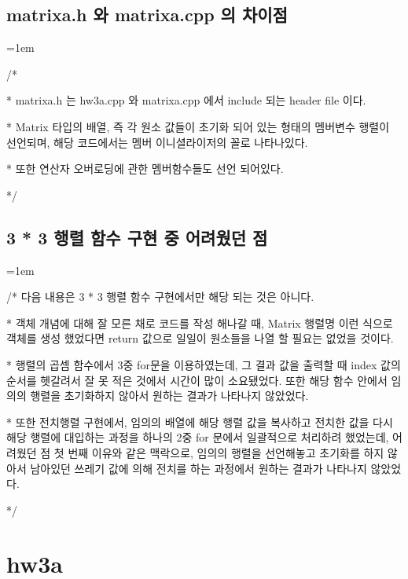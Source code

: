 \documentclass[twoside,twocolumn]{article}
\newenvironment{itemizeReduced}{
\begin{list}{\labelitemi}{\leftmargin=1em}
\setlength{\itemsep}{1pt}
\setlength{\parskip}{0pt}
\setlength{\parsep}{0pt}}{\end{list}
}
\begin{document}
\subsection{matrixa.h 와 matrixa.cpp 의 차이점}
\begin{itemizeReduced}
    \item[/*]
    \item[*] matrixa.h 는 hw3a.cpp 와 matrixa.cpp 에서 include 되는 header file 이다.
    \item[*] Matrix 타입의 배열, 즉 각 원소 값들이 초기화 되어 있는 형태의 멤버변수 행렬이 선언되며, 해당 코드에서는 멤버 이니셜라이저의 꼴로 나타나있다.
    \item[*] 또한 연산자 오버로딩에 관한 멤버함수들도 선언 되어있다.
\end{itemizeReduced}
*/\subsection{3 * 3 행렬 함수 구현 중 어려웠던 점}
\begin{itemizeReduced}
    \item[/*] 다음 내용은 3 * 3 행렬 함수 구현에서만 해당 되는 것은 아니다.
    \item[*] 객체 개념에 대해 잘 모른 채로 코드를 작성 해나갈 때, Matrix 행렬명 이런 식으로 객체를 생성 했었다면 return 값으로 일일이 원소들을 나열 할 필요는 없었을 것이다.
    \item[*] 행렬의 곱셈 함수에서 3중 for문을 이용하였는데, 그 결과 값을 출력할 때 index 값의 순서를 헷갈려서 잘 못 적은 것에서 시간이 많이 소요됐었다. 또한 해당 함수 안에서 임의의 행렬을 초기화하지 않아서 원하는 결과가 나타나지 않았었다.
    \item[*] 또한 전치행렬 구현에서, 임의의 배열에 해당 행렬 값을 복사하고 전치한 값을 다시 해당 행렬에 대입하는 과정을 하나의 2중 for 문에서 일괄적으로 처리하려 했었는데, 어려웠던 점 첫 번째 이유와 같은 맥락으로, 임의의 행렬을 선언해놓고 초기화를 하지 않아서 남아있던 쓰레기 값에 의해 전치를 하는 과정에서 원하는 결과가 나타나지 않았었다.
\end{itemizeReduced}
*/%

\section{hw3a}
\end{document}
